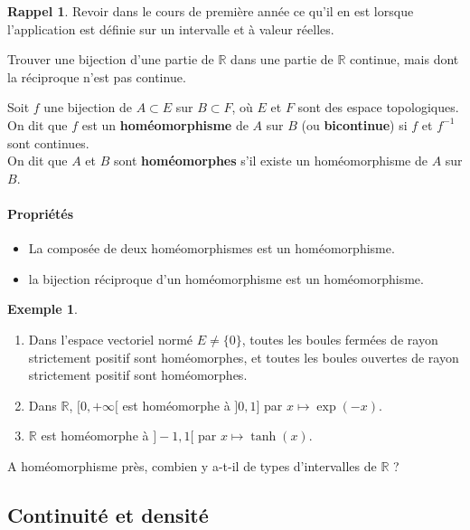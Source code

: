 \documentclass[french]{article}
\newcommand{\R}{\mathbb{R}}
\newcommand{\inv}{^{-1}}
\theoremstyle{plain}
\theoremstyle{definition}
\newtheorem*{ex}{Exemple}
\newtheorem*{rappel}{Rappel}
\theoremstyle{remark}
\begin{document}
\begin{rappel}
	Revoir dans le cours de première année ce qu'il en est lorsque l'application est définie sur un intervalle et à valeur réelles.
\end{rappel}

\begin{exo}
	Trouver une bijection d'une partie de $\R$ dans une partie de $\R$ continue, mais dont la réciproque n'est pas continue.
\end{exo}

\begin{dfn}
	Soit $f$ une bijection de $A\subset E$ sur $B\subset F$, où $E$ et $F$ sont des espace topologiques. On dit que $f$ est un \textbf{homéomorphisme} de $A$ sur $B$ (ou \textbf{bicontinue}) si $f$ et $f\inv$ sont continues. \\
	On dit que $A$ et $B$ sont \textbf{homéomorphes} s'il existe un homéomorphisme de $A$ sur $B$.
\end{dfn}

\paragraph{Propriétés}
\begin{itemize}
	\item La composée de deux homéomorphismes est un homéomorphisme.
	\item la bijection réciproque d'un homéomorphisme est un homéomorphisme.
\end{itemize}

\begin{ex}
	\begin{enumerate}
		\item Dans l'espace vectoriel normé $E\ne\{0\}$, toutes les boules fermées de rayon strictement positif sont homéomorphes, et toutes les boules ouvertes de rayon strictement positif sont homéomorphes.
		\item Dans $\R$, $[0,+\infty[$ est homéomorphe à $]0,1]$ par $x\mapsto \exp(-x)$.
		\item $\R$ est homéomorphe à $]-1,1[$ par $x\mapsto\tanh(x)$.
	\end{enumerate}
\end{ex}

\begin{exo}
	A homéomorphisme près, combien y a-t-il de types d'intervalles de $\R$ ?
\end{exo}

\subsection{Continuité et densité}
\end{document}
